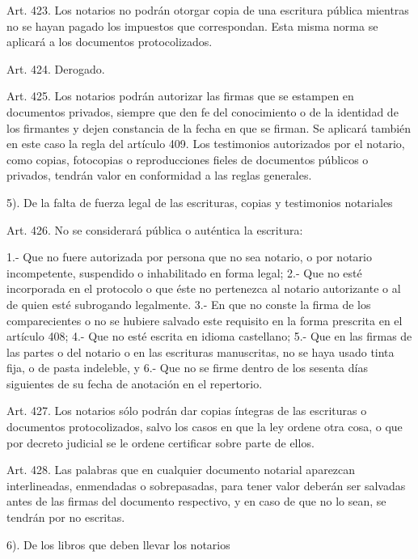     Art. 423. Los notarios no podrán otorgar copia de una escritura pública mientras no se hayan pagado los impuestos que correspondan.
    Esta misma norma se aplicará a los documentos protocolizados.

    Art. 424. Derogado.



    Art. 425. Los notarios podrán autorizar las firmas que se estampen en documentos privados, siempre que den fe del conocimiento o de la identidad de los firmantes y dejen constancia de la fecha en que se firman. Se aplicará también en este caso la regla del artículo 409.
    Los testimonios autorizados por el notario, como copias, fotocopias o reproducciones fieles de documentos públicos o privados, tendrán valor en conformidad a las reglas generales.



    5). De la falta de fuerza legal de las escrituras, copias y testimonios notariales


    Art. 426. No se considerará pública o auténtica la escritura:

    1.- Que no fuere autorizada por persona que no sea notario, o por notario incompetente, suspendido o inhabilitado en forma legal;
    2.- Que no esté incorporada en el protocolo o que éste no pertenezca al notario autorizante o al de quien esté subrogando legalmente.
    3.- En que no conste la firma de los comparecientes o no se hubiere salvado este requisito en la forma prescrita en el artículo 408;
    4.- Que no esté escrita en idioma castellano;
    5.- Que en las firmas de las partes o del notario o en las escrituras manuscritas, no se haya usado tinta fija, o de pasta indeleble, y
    6.- Que no se firme dentro de los sesenta días siguientes de su fecha de anotación en el repertorio.



    Art. 427. Los notarios sólo podrán dar copias íntegras de las escrituras o documentos protocolizados, salvo los casos en que la ley ordene otra cosa, o que por decreto judicial se le ordene certificar sobre parte de ellos.


    Art. 428. Las palabras que en cualquier documento notarial aparezcan interlineadas, enmendadas o sobrepasadas, para tener valor deberán ser salvadas antes de las firmas del documento respectivo, y en caso de que no lo sean, se tendrán por no escritas.


    6). De los libros que deben llevar los notarios


